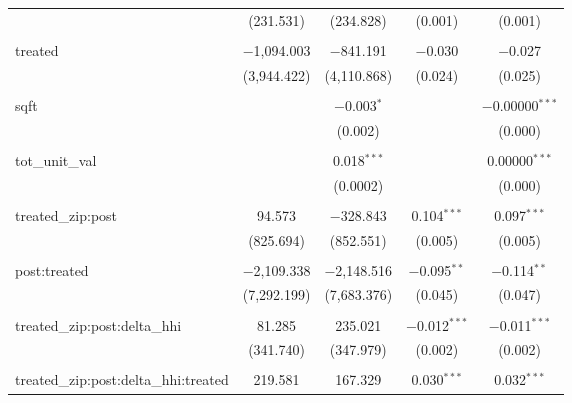 \begin{table}[H]
{\begin{tabular}{@{\extracolsep{5pt}}lcccc}
   & (231.531) & (234.828) & (0.001) & (0.001) \\  

   & & & & \\  

  treated & $-$1,094.003 & $-$841.191 & $-$0.030 & $-$0.027 \\  

   & (3,944.422) & (4,110.868) & (0.024) & (0.025) \\  

   & & & & \\  

  sqft &  & $-$0.003$^{*}$ &  & $-$0.00000$^{***}$ \\  

   &  & (0.002) &  & (0.000) \\  

   & & & & \\  

  tot\_unit\_val &  & 0.018$^{***}$ &  & 0.00000$^{***}$ \\  

   &  & (0.0002) &  & (0.000) \\  

   & & & & \\  

  treated\_zip:post & 94.573 & $-$328.843 & 0.104$^{***}$ & 0.097$^{***}$ \\  

   & (825.694) & (852.551) & (0.005) & (0.005) \\  

   & & & & \\  

  post:treated & $-$2,109.338 & $-$2,148.516 & $-$0.095$^{**}$ & $-$0.114$^{**}$ \\  

   & (7,292.199) & (7,683.376) & (0.045) & (0.047) \\  

   & & & & \\  

  treated\_zip:post:delta\_hhi & 81.285 & 235.021 & $-$0.012$^{***}$ & $-$0.011$^{***}$ \\  

   & (341.740) & (347.979) & (0.002) & (0.002) \\  

   & & & & \\  

  treated\_zip:post:delta\_hhi:treated & 219.581 & 167.329 & 0.030$^{***}$ & 0.032$^{***}$ \\  


\end{tabular}}
\end{table}
